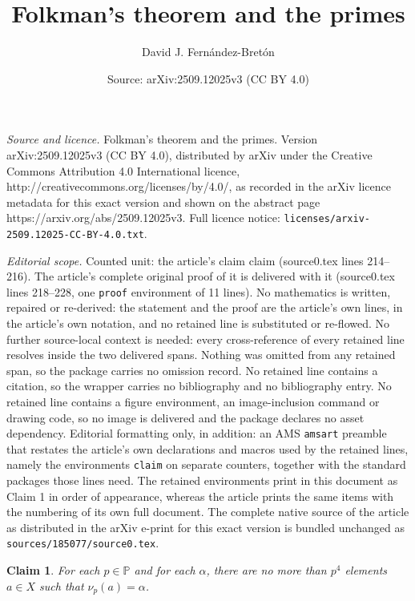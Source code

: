 \documentclass[10pt,a4paper]{amsart}
\title{Folkman's theorem and the primes}
\author{David J. Fern\'andez-Bret\'on}
\date{Source: arXiv:2509.12025v3 (CC BY 4.0)}
\newtheorem{claim}{Claim}
\begin{document}
\maketitle

\noindent\emph{Source and licence.} Folkman's theorem and the primes. Version arXiv:2509.12025v3 (CC BY 4.0), distributed by arXiv under the Creative Commons Attribution 4.0 International licence, http://creativecommons.org/licenses/by/4.0/, as recorded in the arXiv licence metadata for this exact version and shown on the abstract page https://arxiv.org/abs/2509.12025v3. Full licence notice: \texttt{licenses/arxiv-2509.12025-CC-BY-4.0.txt}.\par\smallskip

\noindent\textit{Editorial scope.} Counted unit: the article's claim claim (source0.tex lines 214--216). The article's complete original proof of it is delivered with it (source0.tex lines 218--228, one \texttt{proof} environment of 11 lines). No mathematics is written, repaired or re-derived: the statement and the proof are the article's own lines, in the article's own notation, and no retained line is substituted or re-flowed.  No further source-local context is needed: every cross-reference of every retained line resolves inside the two delivered spans.  Nothing was omitted from any retained span, so the package carries no omission record.  No retained line contains a citation, so the wrapper carries no bibliography and no bibliography entry.  No retained line contains a figure environment, an image-inclusion command or drawing code, so no image is delivered and the package declares no asset dependency.  Editorial formatting only, in addition: an AMS \texttt{amsart} preamble that restates the article's own declarations and macros used by the retained lines, namely the environments \texttt{claim} on separate counters, together with the standard packages those lines need.  The retained environments print in this document as Claim 1 in order of appearance, whereas the article prints the same items with the numbering of its own full document.  The complete native source of the article as distributed in the arXiv e-print for this exact version is bundled unchanged as \texttt{sources/185077/source0.tex}.
\begin{claim}
For each $p\in\mathbb P$ and for each $\alpha$, there are no more than $p^4$ elements $a\in X$ such that $\nu_p(a)=\alpha$. 
\end{claim}
\end{document}

